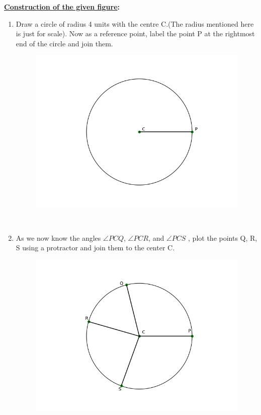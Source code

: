 \documentclass[journal,12pt,twocolumn]{IEEEtran}
\begin{document}
\textbf{\underline{Construction of the given figure}: }\\
\begin{enumerate}
\item Draw a circle of radius 4 units with the centre C.(The radius mentioned here is just for scale). Now as a reference point, label the point P at the rightmost end of the circle and join them.
\begin{figure}[ht]
    \centering
    \includegraphics[scale = 0.5]{figs/cnstrct_fig1.png}
\end{figure}\\
\item As we now know the angles $\angle PCQ$, $\angle PCR$, and $\angle PCS$ , plot the points Q, R, S using a protractor and join them to the center C.
\begin{figure}[ht]
    \centering
    \includegraphics[scale = 0.5]{figs/cnstrct_fig2.png}

\end{figure}
\end{enumerate}
\end{document}
